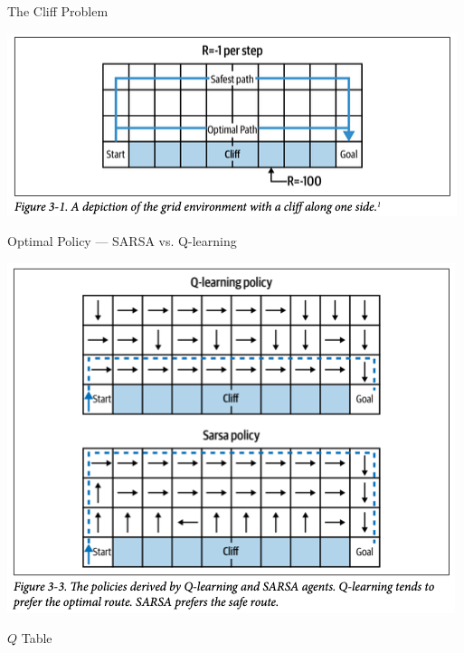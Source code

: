 \documentclass[11pt]{beamer}
\begin{document}
\begin{frame}{The Cliff Problem}

\begin{center}
\includegraphics[width=.65\linewidth]{images/Cliff_problem}
\end{center}

\end{frame}

\begin{frame}{Optimal Policy --- SARSA vs. Q-learning}

\begin{minipage}{.6\linewidth}
\begin{center}
\includegraphics[width=.9\linewidth]{images/Optimal_sarsa_vs_q_learning}
\end{center}
\end{minipage}\begin{minipage}{.4\linewidth}
\begin{center}
$Q$ Table
\end{center}

\vspace{-1.5\baselineskip}

\begin{center}
\end{center}


\end{minipage}
\end{frame}
\end{document}
